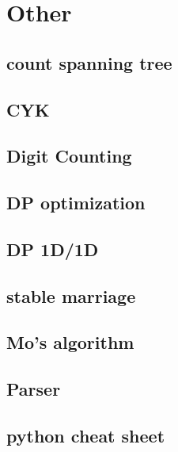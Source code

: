 \section{Other}
	\subsection{count spanning tree}
		
	\subsection{CYK}
		
	\subsection{Digit Counting}
		
	\subsection{DP optimization}
		
	\subsection{DP 1D/1D}
		
%		
%		
	\subsection{stable marriage}
		
	\subsection{Mo's algorithm}
		
	\subsection{Parser}
		
	\subsection{python cheat sheet}
		